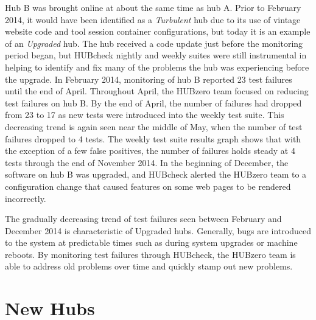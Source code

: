 Hub B was brought online at about the same time as hub A. Prior to February
2014, it would have been identified as a \textit{Turbulent} hub due to its use
of vintage website code and tool session container configurations, but today it
is an example of an \textit{Upgraded} hub. The hub received a code update just
before the monitoring period began, but HUBcheck nightly and weekly suites were
still instrumental in helping to identify and fix many of the problems the hub
was experiencing before the upgrade. In February 2014, monitoring of hub B
reported 23 test failures until the end of April. Throughout April, the HUBzero
team focused on reducing test failures on hub B. By the end of April, the
number of failures had dropped from 23 to 17 as new tests were introduced into
the weekly test suite. This decreasing trend is again seen near the middle of
May, when the number of test failures dropped to 4 tests.  The weekly test
suite results graph shows that with the exception of a few false positives, the
number of failures holds steady at 4 tests through the end of November 2014.
In the beginning of December, the software on hub B was upgraded, and HUBcheck
alerted the HUBzero team to a configuration change that caused features on some
web pages to be rendered incorrectly.

The gradually decreasing trend of test failures seen between February and
December 2014 is characteristic of Upgraded hubs. Generally, bugs are
introduced to the system at predictable times such as during system upgrades or
machine reboots. By monitoring test failures through HUBcheck, the HUBzero team
is able to address old problems over time and quickly stamp out new problems.






\section{New Hubs}
\label{sec:solution_new}

